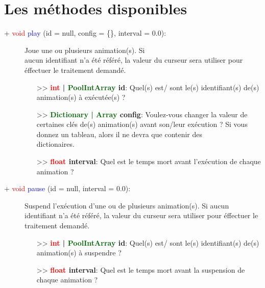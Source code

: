 \documentclass[a4paper, 11pt]{article}
\begin{document}
	\section{Les méthodes disponibles}
	\begin{description}
		\item [+ \textcolor{red}{void} \textcolor{blue}{play} (id = null, config = \{\}, interval = 0.0):]
		Joue une ou plusieurs animation(s). Si \\aucun identifiant n'a été référé, la valeur du curseur sera
		utiliser pour éffectuer le traitement demandé.
		\begin{itemize}
			\item [>> \textbf{\textcolor{red}{int} | \textcolor{darkgreen}{PoolIntArray} id}:] Quel(s) est/
			sont le(s) identifiant(s) de(s) animation(s) à exécutée(s) ?
			\item [>> \textbf{\textcolor{darkgreen}{Dictionary | Array} config}:] Voulez-vous changer la 
			valeur de certaines clés de(s) animation(s) avant son/leur exécution ? Si vous donnez un 
			tableau, alors il ne devra que contenir des \\dictionaires.
			\item [>> \textbf{\textcolor{red}{float} interval}:] Quel est le temps mort avant l'exécution de 
			chaque animation ?\\
		\end{itemize}
	\end{description}
	\begin{description}
		\item [+ \textcolor{red}{void} \textcolor{blue}{pause} (id = null, interval = 0.0):] Suspend
		l'exécution d'une ou de plusieurs animation(s). Si aucun identifiant n'a été référé, la valeur du
		curseur sera utiliser pour éffectuer le traitement demandé.
		\begin{itemize}
			\item [>> \textbf{\textcolor{red}{int} | \textcolor{darkgreen}{PoolIntArray} id}:] Quel(s) est/
			sont le(s) identifiant(s) de(s) animation(s) à suspendre ?
			\item [>> \textbf{\textcolor{red}{float} interval}:] Quel est le temps mort avant la suspension 
			de chaque animation ?\\
		\end{itemize}
	\end{description}
\end{document}
